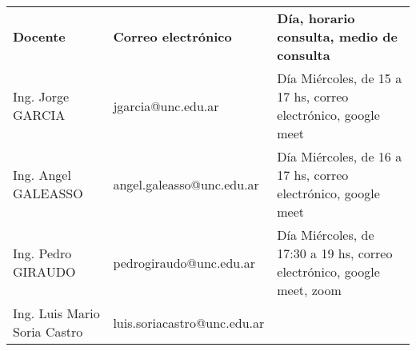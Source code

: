   \begin{tabular}{llm{}} \rowcolor{yellow!30}
 {\bf Docente} & {\bf Correo electr\'onico} & {\bf D\'ia, horario consulta, medio de consulta} \\ \rowcolor{cyan!20}
  Ing. Jorge GARCIA & jgarcia@unc.edu.ar & D\'ia Mi\'ercoles, de 15 a 17 hs, correo electr\'onico, google meet \\ 
  Ing. Angel  GALEASSO & angel.galeasso@unc.edu.ar & D\'ia Mi\'ercoles, de 16 a 17 hs, correo electr\'onico, google meet    \\ \rowcolor{cyan!20} 
    Ing. Pedro GIRAUDO  & pedrogiraudo@unc.edu.ar &  D\'ia Mi\'ercoles, de 17:30 a 19 hs, correo electr\'onico, google meet, zoom     \\

    Ing. Luis Mario Soria Castro & luis.soriacastro@unc.edu.ar &
                                    \\
\end{tabular}